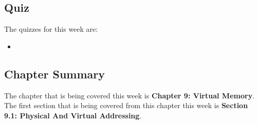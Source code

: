\subsection{Quiz}

The quizzes for this week are:

\begin{itemize}
    \item {} \textbullet {} 
\end{itemize}

\subsection{Chapter Summary}

The chapter that is being covered this week is \textbf{Chapter 9: Virtual Memory}. The first section that is being covered from this chapter this week is \textbf{Section 9.1: Physical And Virtual Addressing}.

